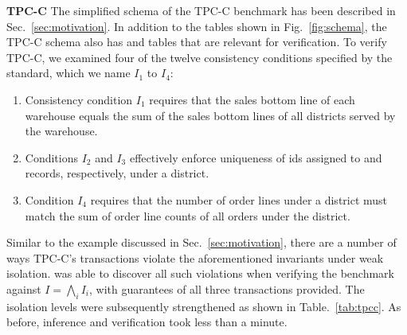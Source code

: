 \textbf{TPC-C} The simplified schema of the TPC-C benchmark has been
described in Sec.~\ref{sec:motivation}. In addition to the tables
shown in Fig.~\ref{fig:schema}, the TPC-C schema also has
 and  tables that are relevant for
verification.  To verify TPC-C, we examined four of the twelve
consistency conditions specified by the standard, which we name $I_1$
to $I_4$:

\begin{enumerate}
\item Consistency condition $I_1$  requires that the sales bottom line
of each warehouse equals the sum of the sales bottom lines of all
districts served by the warehouse.

\item Conditions $I_2$ and $I_3$ effectively enforce uniqueness of ids assigned
  to  and  records, respectively, under a district.


\item  Condition $I_4$ requires that the number of order lines under a district
  must match the sum of order line counts of all orders under the district.
\end{enumerate}

Similar to the example discussed in Sec.~\ref{sec:motivation}, there
are a number of ways TPC-C's transactions violate the aforementioned
invariants under weak isolation. \thetool was able to discover all such
violations when verifying the benchmark against $I =
\bigwedge_{i}I_i$, with guarantees of all three transactions
provided. The isolation levels were subsequently strengthened  as
shown in Table.~\ref{tab:tpcc}.  As before, inference and verification
took less than a minute.

